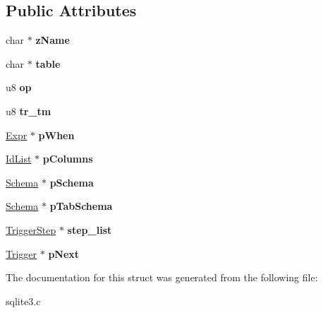\subsection*{Public Attributes}
\begin{DoxyCompactItemize}
\item 
\hypertarget{struct_trigger_a9aecea5dadd7ae93b7f585c4b914791c}{char $\ast$ {\bfseries z\-Name}}\label{struct_trigger_a9aecea5dadd7ae93b7f585c4b914791c}

\item 
\hypertarget{struct_trigger_ab9d5500f7fc43382e867733a2968ecae}{char $\ast$ {\bfseries table}}\label{struct_trigger_ab9d5500f7fc43382e867733a2968ecae}

\item 
\hypertarget{struct_trigger_a855d6b6a302d8d80e1d30ddd70fd403e}{u8 {\bfseries op}}\label{struct_trigger_a855d6b6a302d8d80e1d30ddd70fd403e}

\item 
\hypertarget{struct_trigger_af0d10da140b068bfd76aaeb6607fa6cf}{u8 {\bfseries tr\-\_\-tm}}\label{struct_trigger_af0d10da140b068bfd76aaeb6607fa6cf}

\item 
\hypertarget{struct_trigger_a1b6cdd46e8b98562920d1acee86281ed}{\hyperlink{struct_expr}{Expr} $\ast$ {\bfseries p\-When}}\label{struct_trigger_a1b6cdd46e8b98562920d1acee86281ed}

\item 
\hypertarget{struct_trigger_a8505fbdf63ca9eadf4b2585e99faa4e4}{\hyperlink{struct_id_list}{Id\-List} $\ast$ {\bfseries p\-Columns}}\label{struct_trigger_a8505fbdf63ca9eadf4b2585e99faa4e4}

\item 
\hypertarget{struct_trigger_a83edbfa91ce6520a6ebc1a21acc2cd5e}{\hyperlink{struct_schema}{Schema} $\ast$ {\bfseries p\-Schema}}\label{struct_trigger_a83edbfa91ce6520a6ebc1a21acc2cd5e}

\item 
\hypertarget{struct_trigger_a8e4a9b3f4bcc5c645e1777b3bb94a6d8}{\hyperlink{struct_schema}{Schema} $\ast$ {\bfseries p\-Tab\-Schema}}\label{struct_trigger_a8e4a9b3f4bcc5c645e1777b3bb94a6d8}

\item 
\hypertarget{struct_trigger_a4206faaae6cdf1a2b22a2c9f15c88642}{\hyperlink{struct_trigger_step}{Trigger\-Step} $\ast$ {\bfseries step\-\_\-list}}\label{struct_trigger_a4206faaae6cdf1a2b22a2c9f15c88642}

\item 
\hypertarget{struct_trigger_ac28107e1c45789e0146fe45867b8dfdb}{\hyperlink{struct_trigger}{Trigger} $\ast$ {\bfseries p\-Next}}\label{struct_trigger_ac28107e1c45789e0146fe45867b8dfdb}

\end{DoxyCompactItemize}


The documentation for this struct was generated from the following file\-:\begin{DoxyCompactItemize}
\item 
sqlite3.\-c\end{DoxyCompactItemize}
